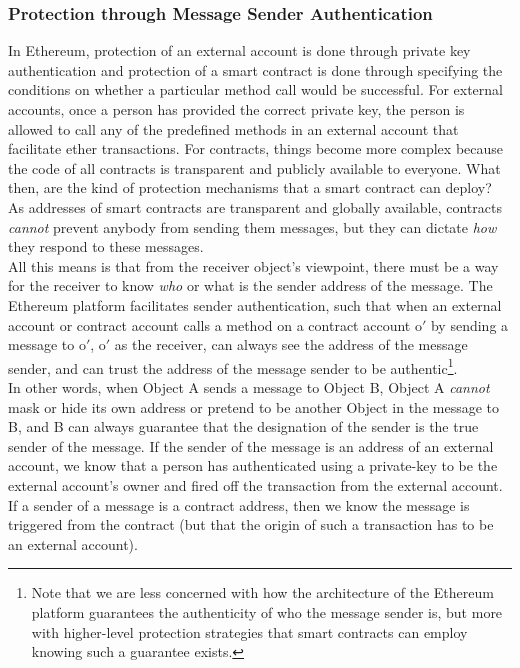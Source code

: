 \documentclass[a4paper,11pt,twoside]{article}
\begin{document}
{\subsubsection{Protection through Message Sender Authentication}
In Ethereum, protection of an external account is done through private key authentication and protection of a smart contract is done through specifying the conditions on whether a particular method call would be successful. For external accounts, once a person has provided the correct private key, the person is allowed to call any of the predefined methods in an external account that facilitate ether transactions. For contracts, things become more complex because the code of all contracts is transparent and publicly available to everyone. What then, are the kind of protection mechanisms that a smart contract can deploy? As addresses of smart contracts are transparent and globally available, contracts \textit{cannot} prevent anybody from sending them messages, but they can dictate \textit{how} they respond to these messages.\\

All this means is that from the receiver object's viewpoint, there must be a way for the receiver to know \textit{who} or what is the sender address of the message. The Ethereum platform facilitates sender authentication, such that when an external account or contract account calls a method on a contract account o$'$ by sending a message to o$'$, o$'$ as the receiver, can always see the address of the message sender, and can trust the address of the message sender to be authentic\footnote{Note that we are less concerned with how the architecture of the Ethereum platform guarantees the authenticity of who the message sender is, but more with higher-level protection strategies that smart contracts can employ knowing such a guarantee exists.}.\\

In other words, when Object A sends a message to Object B, Object A \textit{cannot} mask or hide its own address or pretend to be another Object in the message to B, and B can always guarantee that the designation of the sender is the true sender of the message. If the sender of the message is an address of an external account, we know that a person has authenticated using a private-key to be the external account's owner and fired off the transaction from the external account. If a sender of a message is a contract address, then we know the message is triggered from the contract (but that the origin of such a transaction has to be an external account).\\

}
\end{document}
